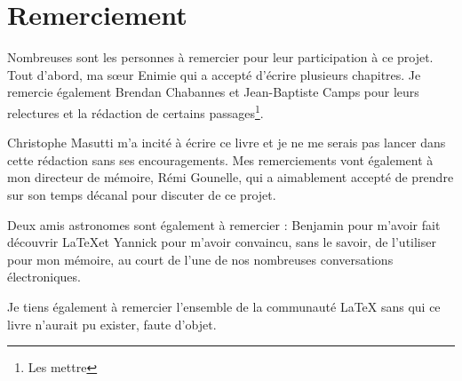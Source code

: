 \section*{Remerciement}

Nombreuses sont les personnes à remercier pour leur participation à ce projet. Tout d'abord, ma sœur Enimie qui a accepté d'écrire plusieurs chapitres. Je remercie également Brendan Chabannes et Jean-Baptiste Camps pour leurs relectures et la rédaction de certains passages\footnote{Les mettre}.

Christophe Masutti m'a incité à écrire ce livre et je ne me serais pas lancer dans cette rédaction sans ses encouragements. Mes remerciements vont également à mon directeur de mémoire, Rémi Gounelle, qui a aimablement accepté de prendre sur son temps décanal pour discuter de ce projet.

Deux amis astronomes sont également à remercier : Benjamin pour m'avoir fait découvrir  \LaTeX et Yannick pour m'avoir convaincu, sans le savoir, de l'utiliser pour mon mémoire, au court de l'une de nos nombreuses conversations électroniques.

Je tiens également à remercier l'ensemble de la communauté \LaTeX{} sans qui ce livre n'aurait pu exister, faute d'objet.
 

